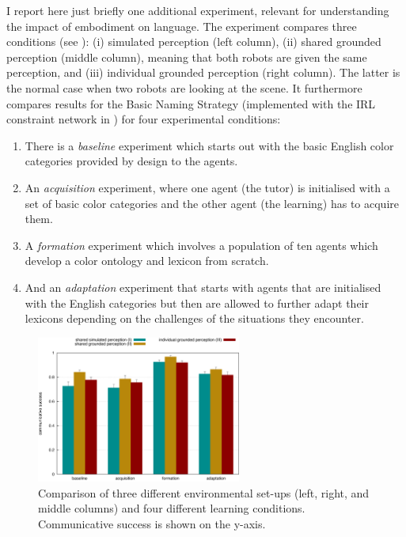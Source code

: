 I report here just briefly one additional experiment, relevant for understanding 
the impact of embodiment on language. The experiment compares three conditions (see ): 
(i) simulated perception (left column), (ii) shared grounded perception (middle column), meaning that both robots 
are given the same perception, and (iii) individual grounded 
perception (right column). The latter is the normal case when two robots are looking at the scene. 
It furthermore compares results for the Basic Naming Strategy (implemented with the IRL constraint network in 
) for four experimental conditions: 
\begin{enumerate}
\item There is a {\it baseline} experiment which starts out with the basic English color categories provided 
by design to the agents. 
\item An {\it acquisition} experiment, where one agent (the tutor) is initialised with a set of basic color categories and 
the other agent (the learning) has to acquire them. 
\item A {\it formation} experiment which involves a population of ten agents which develop a 
color ontology and lexicon from scratch. 
\item And an {\it adaptation} experiment that starts with agents that are initialised with the 
English categories but then are allowed to further adapt their lexicons depending on the challenges of the situations 
they encounter. 
\end{enumerate}
\begin{figure}[htbp]
  \centerline{\includegraphics[width=0.6\textwidth]{chap11/figs/grounding-comparison}}
\caption{\footnotesize Comparison of three different environmental set-ups (left, right, and middle columns)
and four different learning conditions. Communicative success is shown on the y-axis.}
\label{fig:grounding-comparison} 
\end{figure}

